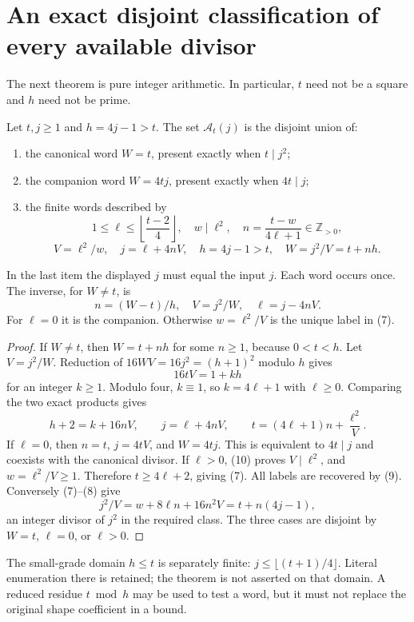 \section{An exact disjoint classification of every available divisor}
The next theorem is pure integer arithmetic. In particular, $t$ need not be a
square and $h$ need not be prime.

\begin{theorem}\label{thm:capacity}
Let $t,j\ge1$ and $h=4j-1>t$. The set $\mathcal A_t(j)$ is the disjoint union of:
\begin{enumerate}
\item the canonical word $W=t$, present exactly when $t\mid j^2$;
\item the companion word $W=4tj$, present exactly when $4t\mid j$;
\item the finite words described by
\[
 1\le\ell\le\left\lfloor\frac{t-2}{4}\right\rfloor,
 \quad w\mid\ell^2,\quad
 n=\frac{t-w}{4\ell+1}\in\mathbb Z_{>0},                  \tag{7}
\]
\[
 V=\ell^2/w,\quad j=\ell+4nV,\quad h=4j-1>t,
 \quad W=j^2/V=t+nh.                                    \tag{8}
\]
\end{enumerate}
In the last item the displayed $j$ must equal the input $j$. Each word occurs
once. The inverse, for $W\ne t$, is
\[
 n=(W-t)/h,\quad V=j^2/W,\quad\ell=j-4nV.                \tag{9}
\]
For $\ell=0$ it is the companion. Otherwise $w=\ell^2/V$ is the unique label
in (7).
\end{theorem}
\begin{proof}
If $W\ne t$, then $W=t+nh$ for some $n\ge1$, because $0<t<h$. Let $V=j^2/W$.
Reduction of $16WV=16j^2=(h+1)^2$ modulo $h$ gives
\[
 16tV=1+kh
\]
for an integer $k\ge1$. Modulo four, $k\equiv1$, so $k=4\ell+1$ with
$\ell\ge0$. Comparing the two exact products gives
\[
 h+2=k+16nV,\qquad j=\ell+4nV,
 \qquad t=(4\ell+1)n+\frac{\ell^2}{V}.                  \tag{10}
\]
If $\ell=0$, then $n=t$, $j=4tV$, and $W=4tj$. This is equivalent to
$4t\mid j$ and coexists with the canonical divisor. If $\ell>0$, (10) proves
$V\mid\ell^2$, and $w=\ell^2/V\ge1$. Therefore $t\ge4\ell+2$, giving (7).
All labels are recovered by (9). Conversely (7)--(8) give
\[
 j^2/V=w+8\ell n+16n^2V=t+n(4j-1),
\]
an integer divisor of $j^2$ in the required class. The three cases are disjoint
by $W=t$, $\ell=0$, or $\ell>0$.
\end{proof}

The small-grade domain $h\le t$ is separately finite:
$j\le\lfloor(t+1)/4\rfloor$. Literal enumeration there is retained; the theorem
is not asserted on that domain. A reduced residue $t\bmod h$ may be used to test
a word, but it must not replace the original shape coefficient in a bound.

